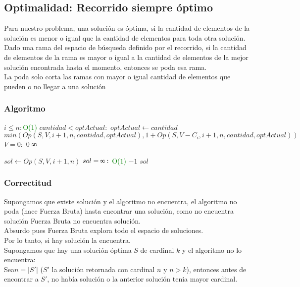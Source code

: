 \subsection{Optimalidad: Recorrido siempre \'optimo}
Para nuestro problema, una soluci\'on es \'optima, si la cantidad de elementos de la soluci\'on es menor o igual que la cantidad de elementos para toda otra soluci\'on.\\
Dado una rama del espacio de b\'usqueda definido por el recorrido, si la cantidad de elementos de la rama es mayor o igual a la cantidad de elementos de la mejor soluci\'on encontrada hasta el momento, entonces se poda esa rama.\\
La poda solo corta las ramas con mayor o igual cantidad de elementos que pueden o no llegar a una soluci\'on\\
\subsubsection{Algoritmo}
\begin{codebox}
    \li \If $i \leq n:$\quad\quad\textcolor{green}{O($1$)}
            \Then
    \li        \If $ cantidad < optActual:$
                \Then
                \li $optActual \leftarrow cantidad$
    \li             \Return $min(Op(S,V,i+1,n,cantidad,optActual),1 + Op(S, V-C_{i}, i+1, n, cantidad, optActual))$
            \End
    \li        \If $V = 0:$
                \Then
    \li             \Return $0$
            \End
        \End
    \li \Return $\infinity$

    \end{codebox}
    \begin{codebox}
    \li $sol \leftarrow Op(S,V,i+1,n)$
    \li \If $sol = \infinity:$ \quad\quad\textcolor{green}{O($1$)}
        \Then
    \li   
            \Return $-1$
        \End
    \li     \Return $sol$

    \end{codebox}    
\subsubsection{Correctitud}
Supongamos que existe soluci\'on y el algoritmo no encuentra, el algoritmo no poda (hace Fuerza Bruta) hasta encontrar una soluci\'on, como no encuentra soluci\'on Fuerza Bruta no encuentra soluci\'on. \\
Absurdo pues Fuerza Bruta explora todo el espacio de soluciones.\\
Por lo tanto, si hay soluci\'on la encuentra.\\
Supongamos que hay una soluci\'on \'optima $S$ de cardinal $k$ y el algoritmo no lo encuentra:\\
Sea$ n = |S'|$ ($S'$ la soluci\'on retornada con cardinal $n$ y $n > k$), entonces antes de encontrar a $S'$, no hab\'ia soluci\'on o la anterior soluci\'on tenia mayor cardinal.\\

